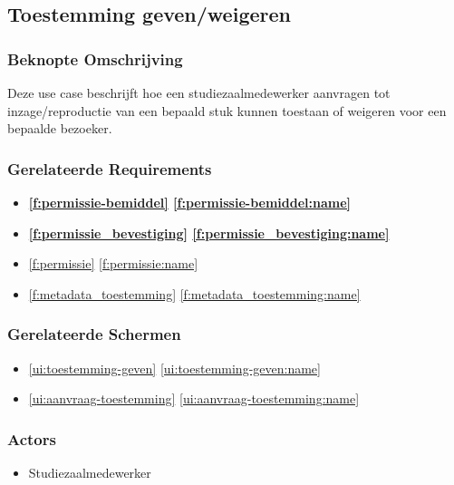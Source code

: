 \documentclass[a4paper,titlepage]{report}
\makeatletter
\def\namedlabel#1#2{
  \label{#1}
  \begingroup
   \def\@currentlabel{#2}%
   \label{#1:name}\endgroup
}
\def\namedref#1{\ref{#1} \ref{#1:name}}
\makeatother
\begin{document}
    \pagebreak
    \subsection{Toestemming geven/weigeren}
    \namedlabel{u:toestemming_beslissen}{Toestemming geven/weigeren}
      \subsubsection{Beknopte Omschrijving}
        Deze use case beschrijft hoe een studiezaalmedewerker aanvragen tot
        inzage/reproductie van een bepaald stuk kunnen toestaan of weigeren
        voor een bepaalde bezoeker.
      \subsubsection{Gerelateerde Requirements}
        \begin{itemize}
          \item \textbf{\namedref{f:permissie-bemiddel}}
          \item \textbf{\namedref{f:permissie_bevestiging}}
          \item \namedref{f:permissie}
          \item \namedref{f:metadata_toestemming}
        \end{itemize}
      \subsubsection{Gerelateerde Schermen}
        \begin{itemize}
          \item \namedref{ui:toestemming-geven}
          \item \namedref{ui:aanvraag-toestemming}
        \end{itemize}
      \subsubsection{Actors}
        \begin{itemize}
          \item Studiezaalmedewerker
        \end{itemize}
\end{document}

